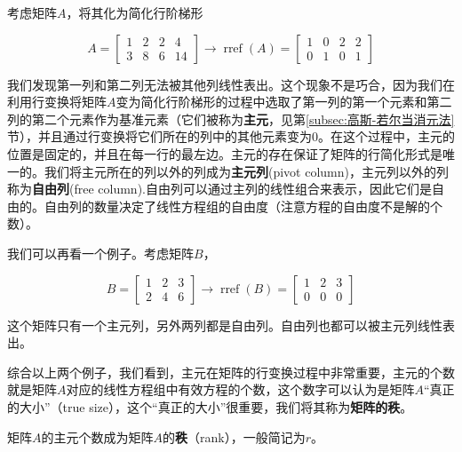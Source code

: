 考虑矩阵$A$，将其化为简化行阶梯形

\begin{equation*}
A=\left[\begin{array}{rrrr}
1 & 2 & 2 & 4 \\
3 & 8 & 6 & 14
\end{array}\right]    
\longrightarrow
\operatorname{rref}(A)=\left[\begin{array}{llll}
1 & 0 & 2 & 2 \\
0 & 1 & 0 & 1
\end{array}\right]
\label{eq:矩阵的秩例子1}
\end{equation*}

我们发现第一列和第二列无法被其他列线性表出。这个现象不是巧合，因为我们在利用行变换将矩阵$A$变为简化行阶梯形的过程中选取了第一列的第一个元素和第二列的第二个元素作为基准元素（它们被称为\textbf{主元}，见第\ref{subsec:高斯-若尔当消元法}节），并且通过行变换将它们所在的列中的其他元素变为0。在这个过程中，主元的位置是固定的，并且在每一行的最左边。主元的存在保证了矩阵的行简化形式是唯一的。我们将主元所在的列以外的列成为\textcolor{third}{\bf 主元列}(pivot column)，主元列以外的列称为\textcolor{third}{\bf 自由列}(free column).自由列可以通过主列的线性组合来表示，因此它们是自由的。自由列的数量决定了线性方程组的自由度（注意方程的自由度不是解的个数）。

我们可以再看一个例子。考虑矩阵$B$，

\begin{equation*}
B=\left[\begin{array}{rrr}
1 & 2 & 3 \\
2 & 4 & 6
\end{array}\right]
\longrightarrow
\operatorname{rref}(B)=\left[\begin{array}{rrr}
1 & 2 & 3 \\
0 & 0 & 0
\end{array}\right]
\label{eq:矩阵的秩例子2}
\end{equation*}

这个矩阵只有一个主元列，另外两列都是自由列。自由列也都可以被主元列线性表出。

综合以上两个例子，我们看到，主元在矩阵的行变换过程中非常重要，主元的个数就是矩阵$A$对应的线性方程组中有效方程的个数，这个数字可以认为是矩阵$A$“真正的大小”（true size），这个“真正的大小”很重要，我们将其称为\textbf{矩阵的秩}。

\begin{definition}[矩阵的秩]
    矩阵$A$的主元个数成为矩阵$A$的\textcolor{third}{\bf 秩}（rank），一般简记为$r$。
\end{definition}

